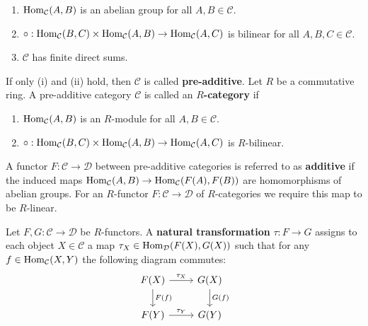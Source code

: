 \begin{enumerate}[label=(\roman*)]
\item $\operatorname{Hom}_\mathcal{C}(A,B)$ is an abelian group for all $A,B \in \mathcal{C}$.
\item $\circ:\operatorname{Hom}_\mathcal{C}(B,C) \times \operatorname{Hom}_\mathcal{C}(A,B) \to \operatorname{Hom}_\mathcal{C}(A,C)$ is bilinear for all $A,B,C \in \mathcal{C}$.
\item $\mathcal{C}$ has finite direct sums.
\end{enumerate}
%
If only (i) and (ii) hold, then $\mathcal{C}$ is called \textbf{pre-additive}.
%
Let $R$ be a commutative ring. A pre-additive category $\mathcal{C}$ is called an
\textbf{$R$-category} if
\begin{enumerate}[label=(\roman*)]
\item $\operatorname{Hom}_\mathcal{C}(A,B)$ is an $R$-module for all $A,B \in \mathcal{C}$.
\item $\circ:\operatorname{Hom}_\mathcal{C}(B,C) \times \operatorname{Hom}_\mathcal{C}(A,B) \to \operatorname{Hom}_\mathcal{C}(A,C)$ is $R$-bilinear.
\end{enumerate}
%
A functor $F: \mathcal{C} \to \mathcal{D}$ between pre-additive categories is referred to as
\textbf{additive} if the induced maps $\operatorname{Hom}_\mathcal{C}(A,B) \to \operatorname{Hom}_\mathcal{C}(F(A),F(B))$ are
homomorphisms of abelian groups. For an $R$-functor $F: \mathcal{C} \to \mathcal{D}$ of $R$-categories
we require this map to be $R$-linear.
%
\begin{definition}
Let $F,G: \mathcal{C} \to \mathcal{D}$ be $R$-functors. A \textbf{natural transformation} $\tau: F \to G$ assigns to each object $X\in \mathcal C$ a map $\tau_X\in \operatorname{Hom}_\mathcal{D}(F(X), G(X))$ such that for any $f\in \operatorname{Hom}_\mathcal{C}(X,Y)$ the following diagram commutes:
\[
  \begin{tikzcd}
    F(X) \rar["\tau_X"] \dar["F(f)"]& G(X) \dar["G(f)"]\\
    F(Y) \rar["\tau_Y"]& G(Y)
  \end{tikzcd}
\]
\end{definition}


